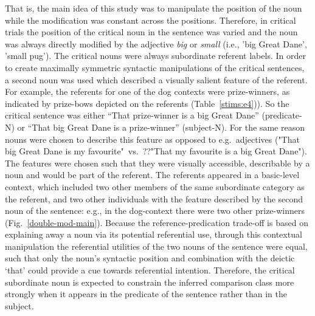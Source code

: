 That is, the main idea of this study was to manipulate the position of the noun while the modification was constant across the positions. Therefore, in critical trials the position of the critical noun in the sentence was varied and the noun was always directly modified by the adjective \textit{big} or \textit{small} (i.e., 'big Great Dane', 'small pug'). The critical nouns were always subordinate referent labels. In order to create maximally symmetric syntactic manipulations of the critical sentences, a second noun was used which described a visually salient feature of the referent. For example, the referents for one of the dog contexts were prize-winners, as indicated by prize-bows depicted on the referents (Table~\ref{stims:e4})). So the critical sentence was either “That prize-winner is a big Great Dane” (predicate-N) or “That big Great Dane is a prize-winner” (subject-N). For the same reason nouns were chosen to describe this feature as opposed to e.g.~adjectives ("That big Great Dane is my favourite"~vs.~??"That my favourite is a big Great Dane"). The features were chosen such that they were visually accessible, describable by a noun and would be part of the referent.   
The referents appeared in a basic-level context, which included two other members of the same subordinate category as the referent, and two other individuals with the feature described by the second noun of the sentence: e.g., in the dog-context there were two other prize-winners (Fig.~\ref{double-mod-main}). Because the reference-predication trade-off is based on explaining away a noun via its potential referential use, through this contextual manipulation the referential utilities of the two nouns of the sentence were equal, such that only the noun’s syntactic position and combination with the deictic ‘that’ could provide a cue towards referential intention. Therefore, the critical subordinate noun is expected to constrain the inferred comparison class more strongly when it appears in the predicate of the sentence rather than in the subject. 

